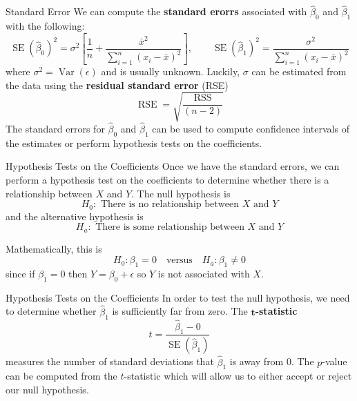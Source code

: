 \documentclass[
  ignorenonframetext,
  aspectratio=169,
]{beamer}
\begin{document}
\begin{frame}{Standard Error}
\protect\hypertarget{standard-error}{}
We can compute the \textbf{standard erorrs} associated with
\(\hat \beta_0\) and \(\hat \beta_1\) with the following: \[
\operatorname{SE}\left(\hat{\beta}_{0}\right)^{2}=\sigma^{2}\left[\frac{1}{n}+\frac{\bar{x}^{2}}{\sum_{i=1}^{n}\left(x_{i}-\bar{x}\right)^{2}}\right], \quad \quad  \operatorname{SE}\left(\hat{\beta}_{1}\right)^{2}=\frac{\sigma^{2}}{\sum_{i=1}^{n}\left(x_{i}-\bar{x}\right)^{2}}
\] where \(\sigma^2 = \operatorname{Var}(\epsilon)\) and is usually
unknown. Luckily, \(\sigma\) can be estimated from the data using the
\textbf{residual standard error} (RSE) \[
\operatorname{RSE} = \sqrt{\frac{\operatorname{RSS}}{(n-2)}}
\] The standard errors for \(\hat \beta_0\) and \(\hat \beta_1\) can be
used to compute confidence intervals of the estimates or perform
hypothesis tests on the coefficients.
\end{frame}

\begin{frame}{Hypothesis Tests on the Coefficients}
\protect\hypertarget{hypothesis-tests-on-the-coefficients}{}
Once we have the standard errors, we can perform a hypothesis test on
the coefficients to determine whether there is a relationship between
\(X\) and \(Y\). The null hypothesis is \[
H_0: \text{ There is no relationship between } X \text{ and } Y
\] and the alternative hypothesis is \[
H_{a}: \text { There is some relationship between } X \text { and } Y
\]

Mathematically, this is \[
H_0: \beta_1 = 0 \quad \text{versus} \quad H_a: \beta_1 \neq 0
\] since if \(\beta_1 = 0\) then \(Y = \beta_0 + \epsilon\) so \(Y\) is
not associated with \(X\).
\end{frame}

\begin{frame}{Hypothesis Tests on the Coefficients}
\protect\hypertarget{hypothesis-tests-on-the-coefficients-1}{}
In order to test the null hypothesis, we need to determine whether
\(\hat \beta_1\) is sufficiently far from zero. The
\(\mathbf{t}\)\textbf{-statistic} \[
t=\frac{\hat{\beta}_{1}-0}{\operatorname{SE}(\hat{\beta}_{1})}
\] measures the number of standard deviations that \(\hat \beta_1\) is
away from 0. The \(p\)-value can be computed from the \(t\)-statistic
which will allow us to either accept or reject our null hypothesis.
\end{frame}
\end{document}
